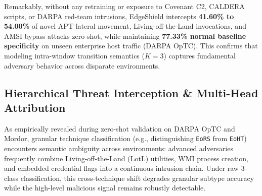 \documentclass[10pt,journal,compsoc]{IEEEtran}
\begin{document}
\begin{table}[htbp]
\caption{Cross-Dataset Zero-Shot Generalization Matrix}
\label{tab:cross_dataset}
\centering
{}
\end{table}

Remarkably, without any retraining or exposure to Covenant C2, CALDERA scripts, or DARPA red-team intrusions, EdgeShield intercepts \textbf{41.60\% to 54.00\%} of novel APT lateral movement, Living-off-the-Land invocations, and AMSI bypass attacks zero-shot, while maintaining \textbf{77.33\% normal baseline specificity} on unseen enterprise host traffic (DARPA OpTC). This confirms that modeling intra-window transition semantics ($K=3$) captures fundamental adversary behavior across disparate environments.

\subsection{Hierarchical Threat Interception \& Multi-Head Attribution}
As empirically revealed during zero-shot validation on DARPA OpTC and Mordor, granular technique classification (e.g., distinguishing \texttt{EoRS} from \texttt{EoHT}) encounters semantic ambiguity across environments: advanced adversaries frequently combine Living-off-the-Land (LotL) utilities, WMI process creation, and embedded credential flags into a continuous intrusion chain. Under raw 3-class classification, this cross-technique shift degrades granular subtype accuracy while the high-level malicious signal remains robustly detectable.
\end{document}
